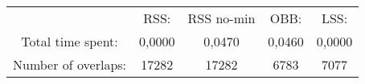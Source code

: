 \begin{tabular}{c|c|c|c|c}\\ 
& RSS: & RSS no-min & OBB: & LSS:\\ 
Total time spent: & 0,0000 & 0,0470 & 0,0460 & 0,0000\\ 
Number of overlaps: &17282 & 17282 & 6783 & 7077\\ 
\end{tabular}